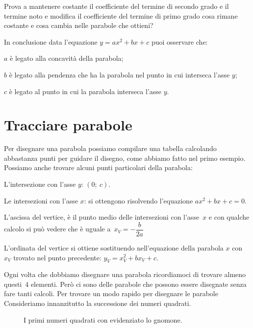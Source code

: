 Prova a mantenere costante il coefficiente del termine di secondo grado e 
il termine noto e modifica
il coefficiente del termine di primo grado
cosa rimane costante e cosa cambia nelle parabole che ottieni?

In conclusione data l'equazione \(y=ax^2+bx+c\) puoi osservare che:
\begin{enumerate*}
 \item \(a\) è legato alla concavità della parabola;
 \item \(b\) è legato alla pendenza che ha la parabola nel punto in cui 
  interseca l'asse \(y\);
 \item \(c\) è legato al punto in cui la parabola interseca l'asse \(y\).
\end{enumerate*}

\section{Tracciare parabole}
\label{sec:parabola_disegno}

Per disegnare una parabola possiamo compilare una tabella calcolando 
abbastanza punti per guidare il disegno, come abbiamo fatto nel primo 
esempio.
Possiamo anche trovare alcuni punti particolari della parabola:

\begin{enumerate*}
 \item L'intersezione con l'asse \(y\): \((0;~c)\).
 \item Le intersezioni con l'asse \(x\): si ottengono risolvendo l'equazione
  \(ax^2+bx+c=0\).
 \item L'ascissa del vertice, è il punto medio delle intersezioni con 
  l'asse~\(x\) e con qualche calcolo si può vedere che è uguale 
  a~\(x_V=-\dfrac{b}{2a}\)
 \item L'ordinata del vertice si ottiene sostituendo nell'equazione della 
  parabola \(x\) con \(x_V\) trovato nel punto precedente: \(y_V=x_V^2+bx_V+c\).
\end{enumerate*}

Ogni volta che dobbiamo disegnare una parabola ricordiamoci di trovare almeno
questi~4 elementi. Però ci sono delle parabole che possono essere disegnate 
senza fare tanti calcoli. Per trovare un modo rapido per disegnare le parabole 
Consideriamo innanzitutto la successione dei numeri quadrati.

 \begin{inaccessibleblock}
\begin{figure}[h]
\begin{center} \scalebox{1.0}{\quadrati} \end{center}
  \caption{I primi numeri quadrati con evidenziato lo gnomone.}
  \label{fig:parabola_quadrati}
\end{figure}
\end{inaccessibleblock}


